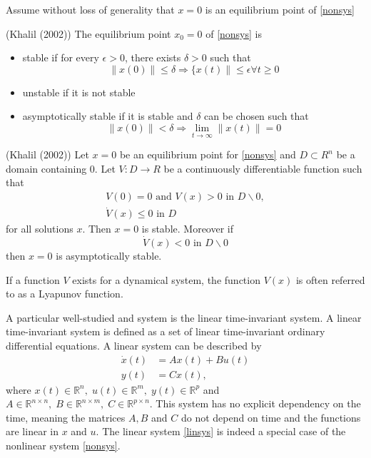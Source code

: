 Assume without loss of generality that $x = 0$ is an equilibrium point of \eqref{nonsys}
\begin{definition}{(Khalil (2002))} The equilibrium point $x_0 = 0$ of \eqref{nonsys} is 
\begin{itemize}
\item  stable if for every $\epsilon >0$, there exists $\delta >0$ such that
\[\|x(0)\|\leq \delta \Rightarrow \{x(t)\|\leq \epsilon \forall t\geq 0\]
\item  unstable if it is not stable
\item asymptotically stable if it is stable and $\delta$ can be chosen such that
\[\|x(0)\|< \delta  \Rightarrow \lim_{t \rightarrow \infty} \|x(t)\|=0\]
\end{itemize}
\end{definition}

\begin{theorem}{ (Khalil (2002))} Let $x=0$ be an equilibrium point for \eqref{nonsys} and $D\subset R^n$ be a domain containing $0$. Let $ V : D \rightarrow R$ be a continuously differentiable function such that
\begin{eqnarray}
 V(0)=0 \mbox{ and }V(x)>0 \mbox{ in } D\backslash{0}, \\
\dot{V}(x)\leq 0 \mbox{ in } D
\end{eqnarray}
for all solutions $x$. Then $x=0$ is stable. Moreover if 
\[\dot{V}(x)< 0 \mbox{ in } D\backslash{0}\]
then $x = 0$ is asymptotically stable.
\end{theorem}
If a function $V$ exists for a dynamical system, the function $V(x) $ is often referred to as a Lyapunov function. 

A particular well-studied and system is the linear time-invariant system.
A linear time-invariant system is defined as a set of linear time-invariant ordinary differential equations. A linear system can be described by
\begin{subequations}
\label{linsys}
\begin{align}
\dot{x}(t)& = A x ( t ) + B u ( t ) \\
y(t) &= C x(t),
\end{align}
\end{subequations}
where $x(t) \in \mathbb{R}^n, \;u(t) \in \mathbb{R}^m, \;y(t) \in \mathbb{R}^p$ 
and $A\in \mathbb{R}^{n\times n},\; B\in \mathbb{R}^{n\times m}, \;C \in 
\mathbb{R}^{p\times n}$. This system has no explicit dependency on the time, meaning the matrices $A,B$ and $C$ do not depend on time and the functions are linear in $x$ and $u$. The linear system \eqref{linsys} is indeed a special case of the nonlinear system \eqref{nonsys}. 

